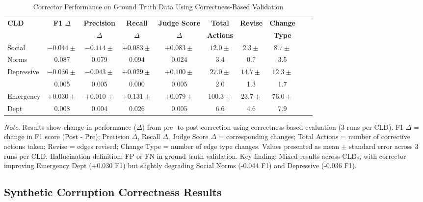 \documentclass{article}
\begin{document}
\begin{table}[H]
\centering
\caption{Corrector Performance on Ground Truth Data Using Correctness-Based Validation}
\label{tab:rq1b_groundtruth_correctness}
\begin{threeparttable}
\begin{tabular}{lccccccccc}
\toprule
\textbf{CLD} & \textbf{F1 $\Delta$} & \textbf{Precision} & \textbf{Recall} & \textbf{Judge Score} & \textbf{Total} & \textbf{Revise} & \textbf{Change} \\
 & & \textbf{$\Delta$} & \textbf{$\Delta$} & \textbf{$\Delta$} & \textbf{Actions} & & \textbf{Type} \\
\midrule
Social        & $-0.044 \pm$ & $-0.114 \pm$ & $+0.083 \pm$ & $+0.083 \pm$ & $12.0 \pm$ & $2.3 \pm$ & $8.7 \pm$ \\
Norms         & 0.087 & 0.079 & 0.094 & 0.024 & 3.4 & 0.7 & 3.5 \\
\midrule
Depressive    & $-0.036 \pm$ & $-0.043 \pm$ & $+0.029 \pm$ & $+0.100 \pm$ & $27.0 \pm$ & $14.7 \pm$ & $12.3 \pm$ \\
              & 0.005 & 0.005 & 0.000 & 0.005 & 2.0 & 1.3 & 1.7 \\
\midrule
Emergency     & $+0.030 \pm$ & $+0.010 \pm$ & $+0.131 \pm$ & $+0.079 \pm$ & $100.3 \pm$ & $23.7 \pm$ & $76.0 \pm$ \\
Dept          & 0.008 & 0.004 & 0.026 & 0.005 & 6.6 & 4.6 & 7.9 \\
\bottomrule
\end{tabular}
\begin{tablenotes}
\small
\item \textit{Note.} Results show change in performance ($\Delta$) from pre- to post-correction using correctness-based evaluation (3 runs per CLD). 
F1 $\Delta$ = change in F1 score (Post - Pre); Precision $\Delta$, Recall $\Delta$, Judge Score $\Delta$ = corresponding changes; 
Total Actions = number of corrective actions taken; Revise = edges revised; Change Type = number of edge type changes. 
Values presented as mean $\pm$ standard error across 3 runs per CLD. 
Hallucination definition: FP or FN in ground truth validation. 
Key finding: Mixed results across CLDs, with corrector improving Emergency Dept (+0.030 F1) but slightly degrading Social Norms (-0.044 F1) and Depressive (-0.036 F1).
\end{tablenotes}
\end{threeparttable}
\end{table}

\subsection{Synthetic Corruption Correctness Results}
\end{document}
